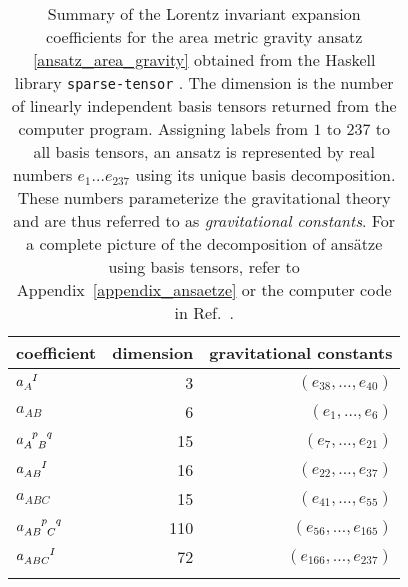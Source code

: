 \begin{table}
  \centering
  \begin{tabular}{l r r}
    \toprule
    coefficient & dimension & gravitational constants \\
    \midrule
    $a_A^{\hphantom AI}$ & 3 & $(e_{38},\dots ,e_{40})$ \\ \addlinespace[2pt]
    $a_{AB}$ & 6 & $(e_{1},\dots ,e_{6})$ \\ \addlinespace[2pt]
    $a_{A\hphantom pB}^{\hphantom Ap\hphantom Bq}$ & 15 & $(e_{7},\dots ,e_{21})$ \\ \addlinespace[2pt]
    $a_{AB}^{\hphantom{AB}I}$ & 16 & $(e_{22},\dots ,e_{37})$ \\ \addlinespace[2pt]
    $a_{ABC}$ & 15 & $(e_{41},\dots ,e_{55})$ \\ \addlinespace[2pt]
    $a_{AB\hphantom pC}^{\hphantom{AB}p\hphantom Cq}$ & 110 & $(e_{56},\dots ,e_{165})$ \\ \addlinespace[2pt]
    $a_{ABC}^{\hphantom{ABC}I}$ & 72 & $(e_{166},\dots ,e_{237})$ \\ \addlinespace[2pt]
    \bottomrule 
  \end{tabular}
  \caption{Summary of the Lorentz invariant expansion coefficients for the area metric gravity ansatz \eqref{ansatz_area_gravity} obtained from the Haskell library \texttt{sparse-tensor} \cite{Reinhart_2019_sparse-tensor}. The dimension is the number of linearly independent basis tensors returned from the computer program. Assigning labels from $1$ to $237$ to all basis tensors, an ansatz is represented by real numbers $e_1\dots e_{237}$ using its unique basis decomposition. These numbers parameterize the gravitational theory and are thus referred to as \emph{gravitational constants}. For a complete picture of the decomposition of ansätze using basis tensors, refer to Appendix~\ref{appendix_ansaetze} or the computer code in Ref.\ \cite{Alex_2020_area-metric-gravity}.}
  \label{table_area_ansaetze}
\end{table}

